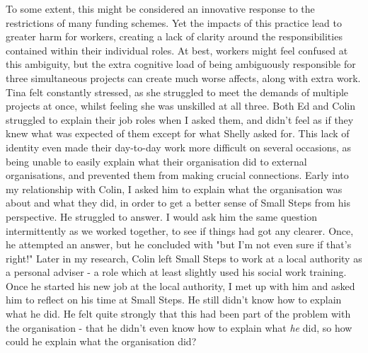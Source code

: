 To some extent, this might be considered an innovative response to the restrictions of many funding schemes. Yet the impacts of this practice lead to greater harm for workers, creating a lack of clarity around the responsibilities contained within their individual roles. At best, workers might feel confused at this ambiguity, but the extra cognitive load of being ambiguously responsible for three simultaneous projects can create much worse affects, along with extra work. Tina felt constantly stressed, as she struggled to meet the demands of multiple projects at once, whilst feeling she was unskilled at all three. Both Ed and Colin struggled to explain their job roles when I asked them, and didn't feel as if they knew what was expected of them except for what Shelly asked for. This lack of identity even made their day-to-day work more difficult on several occasions, as being unable to easily explain what their organisation did to external organisations, and prevented them from making crucial connections. Early into my relationship with Colin, I asked him to explain what the organisation was about and what they did, in order to get a better sense of  Small Steps from his perspective. He struggled to answer. I would ask him the same question intermittently as we worked together, to see if things had got any clearer. Once, he attempted an answer, but he concluded with "but I’m not even sure if that’s right!" Later in my research, Colin left Small Steps to work at a local authority as a personal adviser - a role which at least slightly used his social work training. Once he started his new job at the local authority, I met up with him and asked him to reflect on his time at Small Steps. He still didn't know how to explain what he did. He felt quite strongly that this had been part of the problem with the organisation - that he didn't even know how to explain what \emph{he} did, so how could he explain what the organisation did? 


